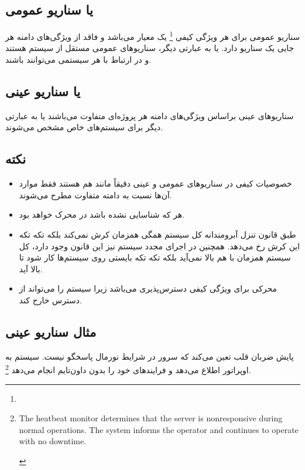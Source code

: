 \subsection{ یا سناریو عمومی}

سناریو عمومی برای هر ویژگی کیفی \footnote{} یک معیار
می‌باشد و فاقد از ویژگی‌های دامنه هر جایی یک سناریو دارد. یا به عبارتی دیگر،
سناریو‌های عمومی مستقل از سیستم هستند و در ارتباط با هر سیستمی می‌توانند باشند.

\subsection{ یا سناریو عینی}

سناریو‌های عینی براساس ویژگی‌های دامنه هر پروژه‌ای متفاوت می‌باشند یا به عبارتی
دیگر برای سیستم‌های خاص مشخص می‌شوند.

\subsection*{نکته}

\begin{itemize}
    \item خصوصیات کیفی در سناریو‌های عمومی و عینی دقیقاً مانند هم هستند فقط
    موارد‌ آن‌ها نسبت به دامته متفاوت مطرح می‌شوند.
    \item هر  که شناسایی نشده باشد در محرک خواهد بود.
    \item طبق قانون تنزل آبرومندانه کل سیستم همگی همزمان کرش نمی‌کند بلکه تکه
    تکه این کرش رخ می‌دهد. همچنین در اجرای مجدد سیستم نیز این قانون وجود دارد،
    کل سیستم همزمان با هم بالا نمی‌آید بلکه تکه تکه بایستی روی سیستم‌ها کار شود
    تا بالا آید.
    \item {} محرکی برای ویژگی کیفی دسترس‌پذیری می‌باشد زیرا سیستم را
    می‌تواند از دسترس خارج کند.
\end{itemize}

\subsection{مثال سناریو عینی}

پایش ضربان قلب تعین می‌کند که سرور در شرایط نورمال پاسخگو نیست. سیستم به
اوپراتور اطلاع می‌دهد و فرایند‌های خود را بدون داون‌تایم انجام می‌دهد
\footnote{\begin{LTR}
    The heatbeat monitor determines that the server is nonresponsive during
    normal operations. The system informs the operator and continues to operate
    with no downtime.
\end{LTR}}.

